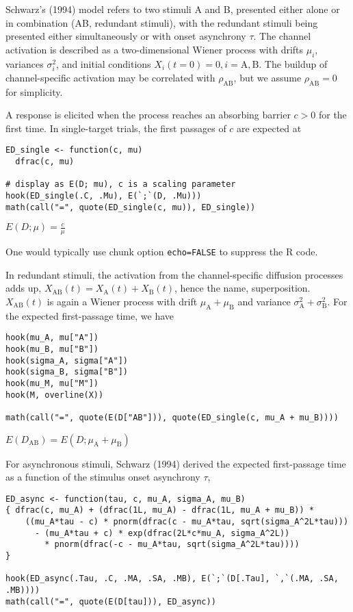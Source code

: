 Schwarz's (1994) model refers to two stimuli A and B, presented either
alone or in combination (AB, redundant stimuli), with the redundant stimuli
being presented either simultaneously or with onset asynchrony \(\tau\). The
channel activation is described as a two-dimensional Wiener process with
drifts \(\mu_i\), variances \(\sigma^2_i\), and initial
conditions \(X_i(t = 0) = 0, i = \mathrm{A, B}\). The buildup of
channel-specific activation may be correlated with \(\rho_{\mathrm{AB}}\), but
we assume \(\rho_{\mathrm{AB}} = 0\) for simplicity.

A response is elicited when the process reaches an absorbing barrier \(c > 0\)
for the first time. In single-target trials, the first passages of \(c\) are
expected at

\begin{verbatim}
ED_single <- function(c, mu)
  dfrac(c, mu)

# display as E(D; mu), c is a scaling parameter
hook(ED_single(.C, .Mu), E(`;`(D, .Mu)))
math(call("=", quote(ED_single(c, mu)), ED_single))
\end{verbatim}

\({E{\left({D}{;}{\mu}\right)}}{=}{\displaystyle{\frac{c}{\mu}}}\)

One would typically use chunk option \texttt{echo=FALSE} to suppress the R code.

In redundant stimuli, the activation from the channel-specific diffusion
processes adds up, \(X_{\mathrm{AB}}(t) = X_{\mathrm A}(t) + X_{\mathrm B}(t)\),
hence the name, superposition. \(X_{\mathrm{AB}}(t)\) is again a Wiener process
with drift \(\mu_{\mathrm A} + \mu_{\mathrm B}\) and
variance \(\sigma^2_{\mathrm A} + \sigma^2_{\mathrm B}\). For the expected
first-passage time, we have

\begin{verbatim}
hook(mu_A, mu["A"])
hook(mu_B, mu["B"])
hook(sigma_A, sigma["A"])
hook(sigma_B, sigma["B"])
hook(mu_M, mu["M"])
hook(M, overline(X))

math(call("=", quote(E(D["AB"])), quote(ED_single(c, mu_A + mu_B))))
\end{verbatim}

\({E{\left({D}_{\mathrm{AB}}\right)}}{=}{E{\left({D}{;}{{{\mu}_{\mathrm{A}}}{+}{{\mu}_{\mathrm{B}}}}\right)}}\)

For asynchronous stimuli, Schwarz (1994) derived the expected
first-passage time as a function of the stimulus onset asynchrony \(\tau\),

\begin{verbatim}
ED_async <- function(tau, c, mu_A, sigma_A, mu_B)
{ dfrac(c, mu_A) + (dfrac(1L, mu_A) - dfrac(1L, mu_A + mu_B)) *
    ((mu_A*tau - c) * pnorm(dfrac(c - mu_A*tau, sqrt(sigma_A^2L*tau)))
      - (mu_A*tau + c) * exp(dfrac(2L*c*mu_A, sigma_A^2L))
        * pnorm(dfrac(-c - mu_A*tau, sqrt(sigma_A^2L*tau))))
}

hook(ED_async(.Tau, .C, .MA, .SA, .MB), E(`;`(D[.Tau], `,`(.MA, .SA, .MB))))
math(call("=", quote(E(D[tau])), ED_async))
\end{verbatim}

